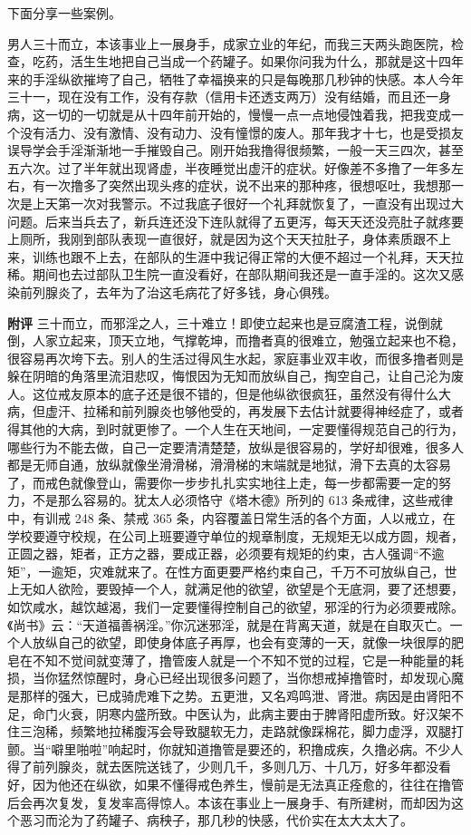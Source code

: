 下面分享一些案例。

\begin{case}
    男人三十而立，本该事业上一展身手，成家立业的年纪，而我三天两头跑医院，检查，吃药，活生生地把自己当成一个药罐子。如果你问我为什么，那就是这十四年来的手淫纵欲摧垮了自己，牺牲了幸福换来的只是每晚那几秒钟的快感。本人今年三十一，现在没有工作，没有存款（信用卡还透支两万）没有结婚，而且还一身病，这一切的一切就是从十四年前开始的，慢慢一点一点地侵蚀着我，把我变成一个没有活力、没有激情、没有动力、没有憧憬的废人。那年我才十七，也是受损友误导学会手淫渐渐地一手摧毁自己。刚开始我撸得很频繁，一般一天三四次，甚至五六次。过了半年就出现肾虚，半夜睡觉出虚汗的症状。好像差不多撸了一年多左右，有一次撸多了突然出现头疼的症状，说不出来的那种疼，很想呕吐，我想那一次是上天第一次对我警示。不过我底子很好一个礼拜就恢复了，一直没有出现过大问题。后来当兵去了，新兵连还没下连队就得了五更泻，每天天还没亮肚子就疼要上厕所，我刚到部队表现一直很好，就是因为这个天天拉肚子，身体素质跟不上来，训练也跟不上去，在部队的生涯中我记得正常的大便不超过一个礼拜，天天拉稀。期间也去过部队卫生院一直没看好，在部队期间我还是一直手淫的。这次又感染前列腺炎了，去年为了治这毛病花了好多钱，身心俱残。

    \textbf{附评} 三十而立，而邪淫之人，三十难立！即使立起来也是豆腐渣工程，说倒就倒，人家立起来，顶天立地，气撑乾坤，而撸者真的很难立，勉强立起来也不稳，很容易再次垮下去。别人的生活过得风生水起，家庭事业双丰收，而很多撸者则是躲在阴暗的角落里流泪悲叹，悔恨因为无知而放纵自己，掏空自己，让自己沦为废人。这位戒友原本的底子还是很不错的，但是他纵欲很疯狂，虽然没有得什么大病，但虚汗、拉稀和前列腺炎也够他受的，再发展下去估计就要得神经症了，或者得其他的大病，到时就更惨了。一个人生在天地间，一定要懂得规范自己的行为，哪些行为不能去做，自己一定要清清楚楚，放纵是很容易的，学好却很难，很多人都是无师自通，放纵就像坐滑滑梯，滑滑梯的末端就是地狱，滑下去真的太容易了，而戒色就像登山，需要你一步步扎扎实实地往上走，每一步都需要一定的努力，不是那么容易的。犹太人必须恪守《塔木德》所列的 613 条戒律，这些戒律中，有训戒 248 条、禁戒 365 条，内容覆盖日常生活的各个方面，人以戒立，在学校要遵守校规，在公司上班要遵守单位的规章制度，无规矩无以成方圆，规者，正圆之器，矩者，正方之器，要成正器，必须要有规矩的约束，古人强调“不逾矩”，一逾矩，灾难就来了。在性方面更要严格约束自己，千万不可放纵自己，世上无如人欲险，要毁掉一个人，就满足他的欲望，欲望是个无底洞，要了还想要，如饮咸水，越饮越渴，我们一定要懂得控制自己的欲望，邪淫的行为必须要戒除。《尚书》云：“天道福善祸淫。”你沉迷邪淫，就是在背离天道，就是在自取灭亡。一个人放纵自己的欲望，即使身体底子再厚，也会有变薄的一天，就像一块很厚的肥皂在不知不觉间就变薄了，撸管废人就是一个不知不觉的过程，它是一种能量的耗损，当你猛然惊醒时，身心已经出现很多问题了，当你想戒掉撸管时，却发现心魔是那样的强大，已成骑虎难下之势。五更泄，又名鸡鸣泄、肾泄。病因是由肾阳不足，命门火衰，阴寒内盛所致。中医认为，此病主要由于脾肾阳虚所致。好汉架不住三泡稀，频繁地拉稀腹泻会导致腿软无力，走路就像踩棉花，脚力虚浮，双腿打颤。当“噼里啪啦”响起时，你就知道撸管是要还的，积撸成疾，久撸必病。不少人得了前列腺炎，就去医院送钱了，少则几千，多则几万、十几万，好多年都没看好，因为他还在纵欲，如果不懂得戒色养生，慢前是无法真正痊愈的，往往在撸管后会再次复发，复发率高得惊人。本该在事业上一展身手、有所建树，而却因为这个恶习而沦为了药罐子、病秧子，那几秒的快感，代价实在太大太大了。
\end{case}

